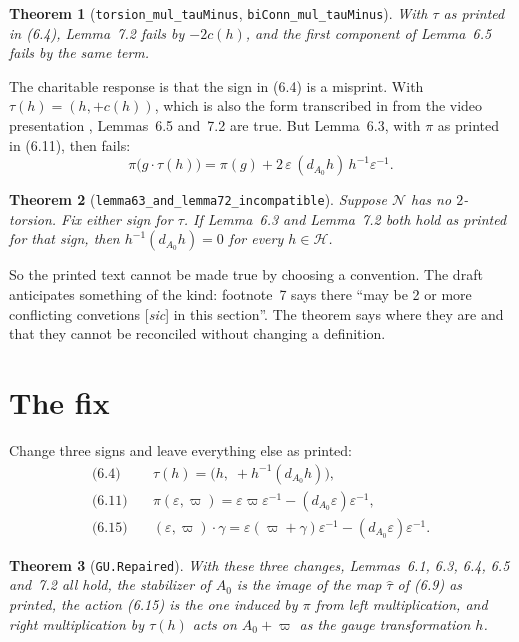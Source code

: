 \documentclass[11pt]{article}
\newtheorem{theorem}{Theorem}
\theoremstyle{remark}
\newcommand{\vp}{\varpi}
\newcommand{\eps}{\varepsilon}
\newcommand{\lean}[1]{\texttt{#1}}
\newcommand{\dA}{d_{A_0}}
\begin{document}
\begin{theorem}[\lean{torsion\_mul\_tauMinus}, \lean{biConn\_mul\_tauMinus}]
With $\tau$ as printed in \textup{(6.4)}, Lemma~7.2 fails by $-2c(h)$, and the first component
of Lemma~6.5 fails by the same term.
\end{theorem}

The charitable response is that the sign in (6.4) is a misprint. With
$\tau(h)=(h,+c(h))$, which is also the form transcribed in \cite[Section~2.2]{NP} from the
video presentation \cite{Video},
Lemmas~6.5 and~7.2 are true. But Lemma~6.3, with $\pi$ as printed in (6.11), then fails:
\[
\pi\bigl(g\cdot\tau(h)\bigr) = \pi(g) + 2\,\eps\,(\dA h)\,h^{-1}\eps^{-1}.
\]

\begin{theorem}[\lean{lemma63\_and\_lemma72\_incompatible}]
Suppose $\mathcal N$ has no $2$-torsion. Fix either sign for $\tau$. If Lemma~6.3 and Lemma~7.2
both hold as printed for that sign, then $h^{-1}(\dA h)=0$ for every $h\in\mathcal H$.
\end{theorem}

So the printed text cannot be made true by choosing a convention. The draft anticipates
something of the kind: footnote~7 says there ``may be 2 or more conflicting convetions [\emph{sic}] in this section''. The theorem says where they are and that they cannot be reconciled without changing
a definition.

\section{The fix}

Change three signs and leave everything else as printed:
\begin{align*}
\text{(6.4)}\quad & \tau(h) = \bigl(h,\; +h^{-1}(\dA h)\bigr),\\
\text{(6.11)}\quad & \pi(\eps,\vp) = \eps\vp\eps^{-1} - (\dA\eps)\eps^{-1},\\
\text{(6.15)}\quad & (\eps,\vp)\cdot\gamma = \eps(\vp+\gamma)\eps^{-1} - (\dA\eps)\eps^{-1}.
\end{align*}

\begin{theorem}[\lean{GU.Repaired}]
With these three changes, Lemmas~6.1, 6.3, 6.4, 6.5 and~7.2 all hold, the stabilizer of $A_0$
is the image of the map $\hat\tau$ of \textup{(6.9)} as printed, the action \textup{(6.15)} is
the one induced by $\pi$ from left multiplication, and right multiplication by $\tau(h)$ acts on
$A_0+\vp$ as the gauge transformation $h$.
\end{theorem}
\end{document}

